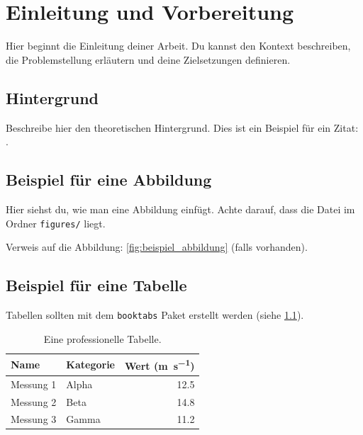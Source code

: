 
\chapter{Einleitung und Vorbereitung}
\label{ch:vorbereitung}

Hier beginnt die Einleitung deiner Arbeit. Du kannst den Kontext beschreiben, die Problemstellung erläutern und deine Zielsetzungen definieren.

\section{Hintergrund}
Beschreibe hier den theoretischen Hintergrund. Dies ist ein Beispiel für ein Zitat: \cite{Smith2020}.

\section{Beispiel für eine Abbildung}
Hier siehst du, wie man eine Abbildung einfügt. Achte darauf, dass die Datei im Ordner \texttt{figures/} liegt.


Verweis auf die Abbildung: \cref{fig:beispiel_abbildung} (falls vorhanden).

\section{Beispiel für eine Tabelle}
Tabellen sollten mit dem \texttt{booktabs} Paket erstellt werden (siehe \cref{tab:beispiel_tabelle}).

\begin{table}[htbp]
    \centering
    \caption{Eine professionelle Tabelle.}
    \label{tab:beispiel_tabelle}
    \begin{tabular}{llr}
        \toprule
        \textbf{Name} & \textbf{Kategorie} & \textbf{Wert (\si{\meter\per\second})} \\
        \midrule
        Messung 1 & Alpha & 12.5 \\
        Messung 2 & Beta  & 14.8 \\
        Messung 3 & Gamma & 11.2 \\
        \bottomrule
    \end{tabular}
\end{table}

